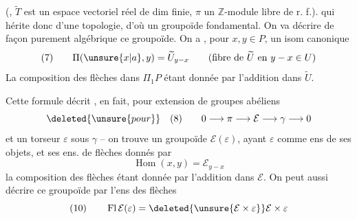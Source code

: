 (, $\widetilde T$ est un espace vectoriel réel de dim finie, $\pi$ un $\mathbb Z$-module libre de r. f.).  qui hérite donc d'une topologie, d'où un groupoïde fondamental. On va décrire de façon purement algébrique ce groupoïde. On a , pour $x,y\in P$, un isom  canonique
\[
(7)\qquad \Pi(\unsure{x|a},y)=\widetilde U_{y-x}
\qquad(\text{fibre de }\widetilde U\text{ en }y-x\in U)
\]
La composition des flèches dans $\Pi_1P$ étant donnée par l'addition dans $\widetilde U$.

 Cette formule décrit , en fait, pour  extension de groupes abéliens
\[
\deleted{\unsure{pour}}\quad(8)\qquad0\longrightarrow\pi\longrightarrow\mathcal E\longrightarrow\gamma\longrightarrow0
\]
et un torseur $\varepsilon$ sous $\gamma$ -- on trouve un \inserted{$\pi$-}groupoïde  $\mathcal E(\varepsilon)$, ayant $\varepsilon$ comme ens de ses objets, et ses ens. de flèches donnés par
\[
\operatorname{Hom}(x,y)=\mathcal E_{y-x}
\]
la composition des flèches étant donnée par l'addition dans $\mathcal E$. On peut aussi décrire ce groupoïde par l'ens des flèches
\[
(10)\qquad \operatorname{Fl}\mathcal E(\varepsilon)=\deleted{\unsure{\mathcal E\times\varepsilon}}\mathcal E\times\varepsilon
\]
